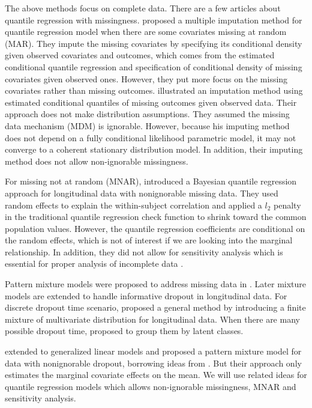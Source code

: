 \documentclass[12pt]{article}
\begin{document}
The above methods focus on complete data.  There are a few articles
about quantile regression with missingness.  \citet{wei2012} proposed
a multiple imputation method for quantile regression model when there
are some covariates missing at random (MAR). They impute the missing
covariates by specifying its conditional density given observed
covariates and outcomes, which comes from the estimated conditional
quantile regression and specification of conditional density of
missing covariates given observed ones.  However, they put more focus
on the missing covariates rather than missing outcomes.
\citet{bottai2013} illustrated an imputation method using estimated
conditional quantiles of missing outcomes given observed data. Their
approach does not make distribution assumptions.  They assumed the
missing data mechanism (MDM) is ignorable. However, because his
imputing method does not depend on a fully conditional likelihood
parametric model, it may not converge to a coherent stationary
distribution model. In addition, their imputing method does not allow
non-ignorable missingness.

For missing not at random (MNAR), \citet{yuan2010} introduced a
Bayesian quantile regression approach for longitudinal data with
nonignorable missing data. They used random effects to explain the
within-subject correlation and applied a $l_2$ penalty in the
traditional quantile regression check function to shrink toward the
common population values. However, the quantile regression
coefficients are conditional on the random effects, which is not of
interest if we are looking into the marginal relationship. In
addition, they did not allow for sensitivity analysis which is
essential for proper analysis of incomplete data \citep{nas2010}.

Pattern mixture models were proposed to address missing data in
\citet{rubin1977}. Later mixture models are extended to handle
informative dropout in longitudinal data. For discrete dropout time
scenario, \citet{little1993, little1994} proposed a general method by
introducing a finite mixture of multivariate distribution for
longitudinal data. When there are many possible dropout time,
\citet{roy2003} proposed to group them by latent classes.

\citet{roy2008} extended \cite{roy2003} to generalized linear models
and proposed a pattern mixture model for data with nonignorable
dropout, borrowing ideas from \citet{heagerty1999}.  But their
approach only estimates the marginal covariate effects on the mean. We
will use related ideas for quantile regression models which allows
non-ignorable missingness, MNAR and sensitivity analysis.
\end{document}
